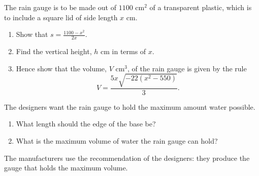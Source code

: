 \documentclass[12pt]{article}
\begin{document}
\begin{enumerate}
\begin{center}
\end{center}
\vspace{1em}

The rain gauge is to be made out of $1100 \text{ cm}^2$ of a transparent plastic, which is to include a square lid of side length $x$ cm.
\begin{enumerate}
    \item[\textbf{a.}] Show that $s = \frac{1100 - x^2}{2x}$.
    \item[\textbf{b.}] Find the vertical height, $h$ cm in terms of $x$.
    \item[\textbf{c.}] Hence show that the volume, $V \text{ cm}^3$, of the rain gauge is given by the rule
    \[ V = \frac{5x\sqrt{-22(x^2 - 550)}}{3}. \]
\end{enumerate}
\vfill

The designers want the rain gauge to hold the maximum amount water possible.

\begin{enumerate}
    \item[\textbf{d.}] What length should the edge of the base be?
    \item[\textbf{e.}] What is the maximum volume of water the rain gauge can hold?
\end{enumerate}


The manufacturers use the recommendation of the designers: they produce the gauge that holds the maximum volume.

\vspace{1em}


\end{enumerate}
\end{document}
